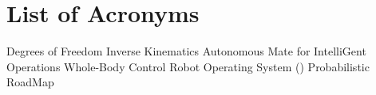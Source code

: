 \section*{List of Acronyms}

\begin{acronym}
			{Degrees of Freedom}
			{Inverse Kinematics}
        {Autonomous Mate for IntelliGent Operations}
			{Whole-Body Control}
			{Robot Operating System (\citet{ROS})}
			{Probabilistic RoadMap}
\end{acronym}

